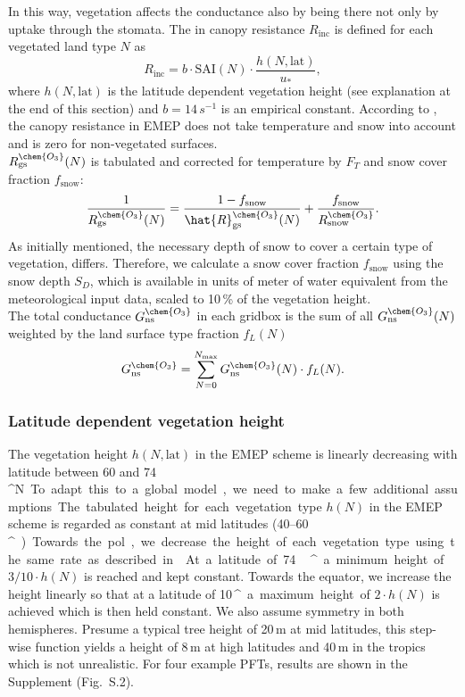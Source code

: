 \documentclass[gmd, manuscript]{copernicus}
\begin{document}
In this way, vegetation affects the conductance also by being there not only by uptake through the stomata. The in canopy resistance $R_\text{inc}$ is defined for each vegetated land type $N$ as
\begin{equation}
  R_\text{inc} = b \cdot \text{SAI}(N) \cdot \frac{h(N, \text{lat})}{u_*},
\end{equation}
where $h(N, \text{lat})$ is the latitude dependent vegetation height (see explanation at the end of this section) and $b = 14\,\unit{s^{-1}}$ is an empirical constant. According to \citet{ACP:Simpson2012}, the canopy resistance in EMEP does not take temperature and snow into account and is zero for non-vegetated surfaces.\\
$R_\text{gs}^\chem{O_3}(N)$ is tabulated and corrected for temperature by $F_T$ and snow cover fraction $f_\text{snow}$:
\begin{equation}
  \frac{1}{R_\text{gs}^\chem{O_3}(N)} = \frac{1-f_\text{snow}}{\hat{R}_\text{gs}^\chem{O_3}(N)} + \frac{f_\text{snow}}{R_\text{snow}^\chem{O_3}}.
\end{equation}
As initially mentioned, the necessary depth of snow to cover a certain type of vegetation, differs. Therefore, we calculate a snow cover fraction $f_\text{snow}$ using the snow depth $S_D$, which is available in units of meter of water equivalent from the meteorological input data, scaled to 10\,\unit{\%} of the vegetation height.\\

The total conductance $G_\text{ns}^\chem{O_3}$ in each gridbox is the sum of all $G_\text{ns}^\chem{O_3}(N)$ weighted by the land surface type fraction $f_L(N)$
\begin{equation}
  G_\text{ns}^\chem{O_3} = \sum_{N=0}^{N_\text{max}}{G_\text{ns}^\chem{O_3}(N) \cdot f_L(N)}.
\end{equation}

\subsubsection*{Latitude dependent vegetation height}
The vegetation height $h(N, \text{lat})$ in the EMEP scheme is linearly decreasing with latitude between 60 and 74\,\unit{^\circ N}. To adapt this to a global model, we need to make a few additional assumptions. The tabulated height for each vegetation type $h(N)$ in the EMEP scheme is regarded as constant at mid latitudes (40--60\,\unit{^\circ}). Towards the pol, we decrease the height of each vegetation type using the same rate as described in \citet{ACP:Simpson2012}. At a latitude of 74\,\unit{^\circ} a minimum height of $3/10 \cdot h(N)$ is reached and kept constant. Towards the equator, we increase the height linearly so that at a latitude of 10\,\unit{^\circ} a maximum height of $2 \cdot h(N)$ is achieved which is then held constant. We also assume symmetry in both hemispheres. Presume a typical tree height of 20\,\unit{m} at mid latitudes, this step-wise function yields a height of 8\,\unit{m} at high latitudes and 40\,\unit{m} in the tropics which is not unrealistic. For four example PFTs, results are shown in the Supplement (Fig.~S.2). 
\end{document}

